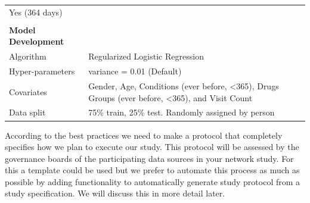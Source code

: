 \documentclass[
]{article}
\begin{document}
\begin{longtable}[]{@{}ll@{}}
\begin{minipage}[t]{0.52\columnwidth}
Yes (364 days)\strut
\end{minipage}\tabularnewline
\begin{minipage}[t]{0.42\columnwidth}\raggedright
\strut
\end{minipage} & \begin{minipage}[t]{0.52\columnwidth}\raggedright
\strut
\end{minipage}\tabularnewline
\begin{minipage}[t]{0.42\columnwidth}\raggedright
\textbf{Model Development}\strut
\end{minipage} & \begin{minipage}[t]{0.52\columnwidth}\raggedright
\strut
\end{minipage}\tabularnewline
\begin{minipage}[t]{0.42\columnwidth}\raggedright
Algorithm\strut
\end{minipage} & \begin{minipage}[t]{0.52\columnwidth}\raggedright
Regularized Logistic Regression\strut
\end{minipage}\tabularnewline
\begin{minipage}[t]{0.42\columnwidth}\raggedright
Hyper-parameters\strut
\end{minipage} & \begin{minipage}[t]{0.52\columnwidth}\raggedright
variance = 0.01 (Default)\strut
\end{minipage}\tabularnewline
\begin{minipage}[t]{0.42\columnwidth}\raggedright
Covariates\strut
\end{minipage} & \begin{minipage}[t]{0.52\columnwidth}\raggedright
Gender, Age, Conditions (ever before, \textless365), Drugs Groups (ever
before, \textless365), and Visit Count\strut
\end{minipage}\tabularnewline
\begin{minipage}[t]{0.42\columnwidth}\raggedright
Data split\strut
\end{minipage} & \begin{minipage}[t]{0.52\columnwidth}\raggedright
75\% train, 25\% test. Randomly assigned by person\strut
\end{minipage}\tabularnewline
\bottomrule
\end{longtable}

According to the best practices we need to make a protocol that
completely specifies how we plan to execute our study. This protocol
will be assessed by the governance boards of the participating data
sources in your network study. For this a template could be used but we
prefer to automate this process as much as possible by adding
functionality to automatically generate study protocol from a study
specification. We will discuss this in more detail later.
\end{document}
